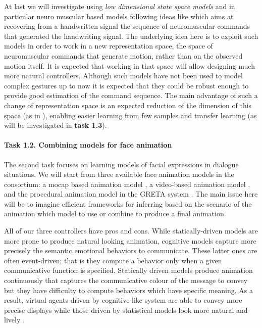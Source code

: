   At last we will investigate using {\it low dimensional state space models} and in particular neuro muscular based models following ideas like \cite{DBLP:conf/icfhr/FischerPOS14} which aims at recovering from a handwritten signal the sequence of neuromuscular commands that generated the handwriting signal. The underlying idea here is to exploit such models in order to work in a new representation space, the space of neuromuscular commands that generate motion, rather than on the observed motion itself. It is expected that working in that space will allow designing much more natural controllers.
  Although such models have not been used to model complex gestures up to now it is expected that they could be robust enough to provide good estimation of the command sequence. The main advantage of such a change of representation space is an expected reduction of the dimension of this space (as in \cite{DBLP:journals/pami/WangFH08}), enabling easier learning from few samples and transfer learning (as will be investigated in \textbf{task 1.3}). 
% 


\paragraph{Task 1.2. Combining models for face animation } 

The second task focuses on learning models of facial expressions in dialogue situations. We will start from three available face animation models in the consortium:  a mocap based animation model \cite{DBLP:conf/icassp/DingRAP13,Ding2014}, a video-based animation model \cite{Barbulescu2014}, and the procedural animation model in the GRETA system  \cite{greta}. The main issue here will be to imagine efficient frameworks for inferring based on the scenario of the animation which model to use or combine to produce a final animation.

All of our three controllers have pros and cons. While statically-driven models are more prone to produce natural looking animation, cognitive
models capture more precisely the semantic emotional behaviors to communicate. These latter ones are often event-driven; that is they compute a behavior only when a given communicative function is specified. Statically driven models produce animation continuously that captures the communicative colour of the message to convey but they have difficulty to compute behaviors which have specific meaning. As a result, virtual agents driven by cognitive-like system are able to convey more precise displays while those driven by statistical models look more natural and lively \cite{DBLP:conf/iva/LeeM12}.

